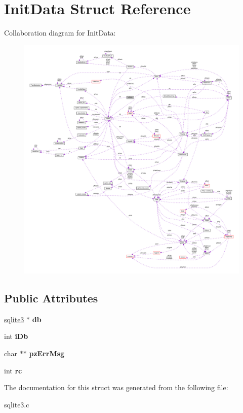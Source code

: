 \hypertarget{struct_init_data}{\section{Init\-Data Struct Reference}
\label{struct_init_data}
}


Collaboration diagram for Init\-Data\-:\nopagebreak
\begin{figure}[H]
\begin{center}
\leavevmode
\includegraphics[width=350pt]{struct_init_data__coll__graph}
\end{center}
\end{figure}
\subsection*{Public Attributes}
\begin{DoxyCompactItemize}
\item 
\hypertarget{struct_init_data_adc9e29c56e0392076e92d7f4b29fa272}{\hyperlink{structsqlite3}{sqlite3} $\ast$ {\bfseries db}}\label{struct_init_data_adc9e29c56e0392076e92d7f4b29fa272}

\item 
\hypertarget{struct_init_data_ad6c7953b49d351cd9fb14e3394010689}{int {\bfseries i\-Db}}\label{struct_init_data_ad6c7953b49d351cd9fb14e3394010689}

\item 
\hypertarget{struct_init_data_aa8aef34241ec214f038b38932ffe1357}{char $\ast$$\ast$ {\bfseries pz\-Err\-Msg}}\label{struct_init_data_aa8aef34241ec214f038b38932ffe1357}

\item 
\hypertarget{struct_init_data_a627153a3de2c4d159ae44ebc03961592}{int {\bfseries rc}}\label{struct_init_data_a627153a3de2c4d159ae44ebc03961592}

\end{DoxyCompactItemize}


The documentation for this struct was generated from the following file\-:\begin{DoxyCompactItemize}
\item 
sqlite3.\-c\end{DoxyCompactItemize}

